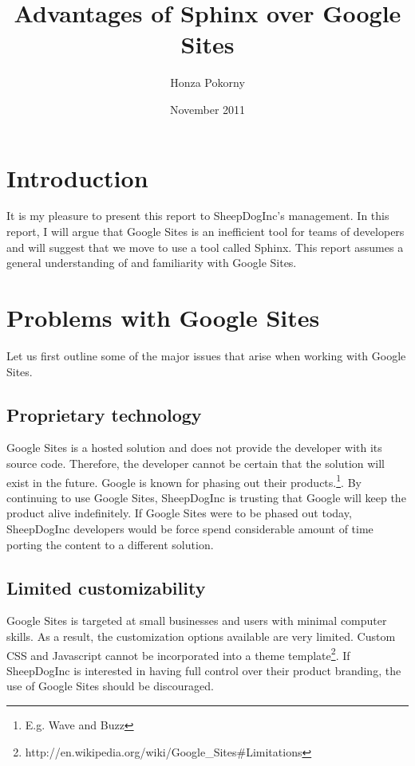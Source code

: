 \documentclass[letterpaper]{report}
\begin{document}
\title{Advantages of Sphinx over Google Sites}
\author{Honza Pokorny}
\date{November 2011}
\maketitle

\section*{Introduction}
    
    It is my pleasure to present this report to SheepDogInc's management. In
    this report, I will argue that Google Sites is an inefficient tool for
    teams of developers and will suggest that we move to use a tool called
    Sphinx. This report assumes a general understanding of and familiarity with
    Google Sites. 

\section*{Problems with Google Sites}

    Let us first outline some of the major issues that arise when working with
    Google Sites.

    \subsection*{Proprietary technology}

        Google Sites is a hosted solution and does not provide the developer
        with its source code. Therefore, the developer cannot be certain that
        the solution will exist in the future. Google is known for 
        phasing out their products.\footnote{E.g. Wave and Buzz}.
        By continuing to use Google Sites, SheepDogInc is trusting that Google
        will keep the product alive indefinitely. If Google Sites were to be
        phased out today, SheepDogInc developers would be force spend
        considerable amount of time porting the content to a different
        solution.

    \subsection*{Limited customizability}
        
        Google Sites is targeted at small businesses and users with minimal
        computer skills. As a result, the customization options available are
        very limited. Custom CSS and Javascript cannot be incorporated into a theme 
        template\footnote{http://en.wikipedia.org/wiki/Google\_Sites\#Limitations}.
        If SheepDogInc is interested in having full control over their product
        branding, the use of Google Sites should be discouraged.
\end{document}
